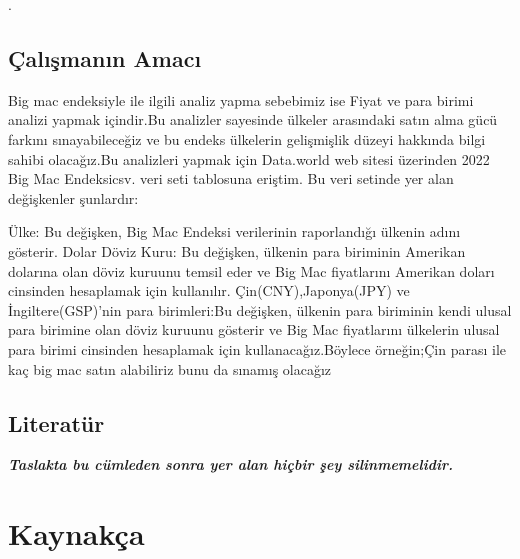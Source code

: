 \documentclass[
  12pt,
]{article}
\newlength{\cslhangindent}
\newlength{\cslentryspacingunit} %
\newenvironment{CSLReferences}[2] %
 {%
  \setlength{\parindent}{0pt}
  \ifodd #1
  \let\oldpar\par
  \def\par{\hangindent=\cslhangindent\oldpar}
  \fi
  \setlength{\parskip}{#2\cslentryspacingunit}
 }%
 {}
\begin{document}
.

\hypertarget{uxe7alux131ux15fmanux131n-amacux131}{%
\subsection{Çalışmanın Amacı}\label{uxe7alux131ux15fmanux131n-amacux131}}

Big mac endeksiyle ile ilgili analiz yapma sebebimiz ise Fiyat ve para birimi analizi yapmak içindir.Bu analizler sayesinde ülkeler arasındaki satın alma gücü farkını sınayabileceğiz ve bu endeks ülkelerin gelişmişlik düzeyi hakkında bilgi sahibi olacağız.Bu analizleri yapmak için Data.world web sitesi üzerinden 2022 Big Mac Endeksicsv. veri seti tablosuna eriştim. Bu veri setinde yer alan değişkenler şunlardır:

Ülke: Bu değişken, Big Mac Endeksi verilerinin raporlandığı ülkenin adını gösterir.
Dolar Döviz Kuru: Bu değişken, ülkenin para biriminin Amerikan dolarına olan döviz kuruunu temsil eder ve Big Mac fiyatlarını Amerikan doları cinsinden hesaplamak için kullanılır.
Çin(CNY),Japonya(JPY) ve İngiltere(GSP)'nin para birimleri:Bu değişken, ülkenin para biriminin kendi ulusal para birimine olan döviz kuruunu gösterir ve Big Mac fiyatlarını ülkelerin ulusal para birimi cinsinden hesaplamak için kullanacağız.Böylece örneğin;Çin parası ile kaç big mac satın alabiliriz bunu da sınamış olacağız

\hypertarget{literatuxfcr}{%
\subsection{Literatür}\label{literatuxfcr}}

\textbf{\emph{Taslakta bu cümleden sonra yer alan hiçbir şey silinmemelidir.}}

\newpage

\hypertarget{references}{%
\section{Kaynakça}\label{references}}

\hypertarget{refs}{}
\begin{CSLReferences}{0}{0}
\end{CSLReferences}
\end{document}
